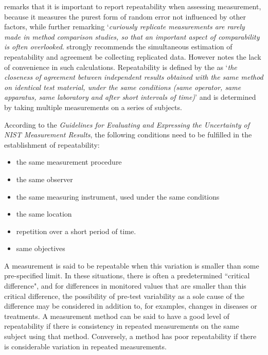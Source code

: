 \documentclass[12pt, a4paper]{report}
\theoremstyle{plain}
\theoremstyle{definition}
\theoremstyle{remark}
\begin{document}
	\citet{Barnhart} remarks that it is important to report repeatability when assessing
	measurement, because it measures the purest form of random error
	not influenced by other factors, while further remarking `\textit{curiously replicate measurements are rarely made in method comparison studies, so that an important aspect of comparability is often overlooked}. \citet{BA99} strongly recommends the simultaneous estimation of repeatability and agreement be collecting replicated data.
	However \citet{ARoy2009} notes the lack of convenience in such calculations. 	Repeatability is defined by the \citet{IUPAC} as `\textit{the closeness of agreement between independent results obtained with the same method on identical test material, under the same conditions (same
		operator, same apparatus, same laboratory and after short intervals of time)}'  and is determined by taking multiple measurements on a series of subjects.
	
	According to the \textit{Guidelines for Evaluating and Expressing the Uncertainty of NIST Measurement Results}, the following conditions need to be fulfilled in the establishment of repeatability:
	\begin{itemize}
		\item	the same measurement procedure
		\item	the same observer
		\item	the same measuring instrument, used under the same conditions
		\item	the same location
		\item	repetition over a short period of time.
		\item  same objectives
	\end{itemize}
	
	
	A measurement is said to be repeatable when this variation is smaller than some pre-specified limit. In these situations, there is often a predetermined ``critical difference", and for differences in monitored values that are smaller than this critical difference, the possibility of pre-test variability as a sole cause of the difference may be considered in addition to, for examples, changes in diseases or treatments. \bigskip
	A measurement method can be said to have a good level of repeatability if there is consistency in repeated measurements on the same subject using that method. Conversely, a method has poor repeatability if there is considerable variation in repeated measurements.	
	
\end{document}
